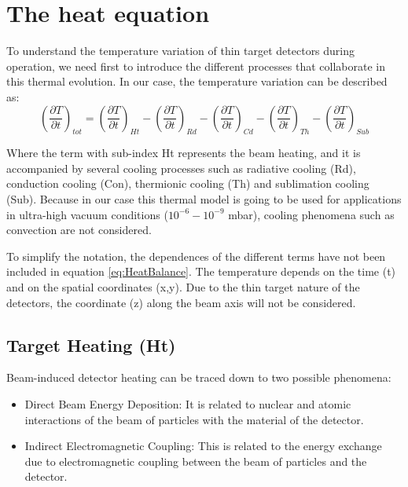 \section{The heat equation}
\label{sec:HeatEq}

To understand the temperature variation of thin target detectors during operation, we need first to introduce the different processes that collaborate in this thermal evolution. In our case, the temperature variation can be described as: 
\begin{equation}
    \left(\frac{\partial T}{\partial t}\right)_{tot} = \left(\frac{\partial T}{\partial t}\right)_{Ht} - \left(\frac{\partial T}{\partial t}\right)_{Rd} - 
                 \left(\frac{\partial T}{\partial t}\right)_{Cd} - \left(\frac{\partial T}{\partial t}\right)_{Th} - \left(\frac{\partial T}{\partial t}\right)_{Sub}
    \label{eq:HeatBalance}
\end{equation}

Where the term with sub-index Ht represents the beam heating, and it is accompanied by several cooling processes such as radiative cooling (Rd), conduction cooling (Con), thermionic cooling (Th) and sublimation cooling (Sub). Because in our case this thermal model is going to be used for applications in ultra-high vacuum conditions ($10^{-6} - 10^{-9}$ mbar), cooling phenomena such as convection are not considered. 

To simplify the notation, the dependences of the different terms have not been included in equation \ref{eq:HeatBalance}. The temperature depends on the time (t) and on the spatial coordinates (x,y). Due to the thin target nature of the detectors, the coordinate (z) along the beam axis will not be considered. 

\subsection{Target Heating (Ht)}
\label{sec:BeamHeating}

Beam-induced detector heating can be traced down to two possible phenomena: 

\begin{itemize}
    \item Direct Beam Energy Deposition: It is related to nuclear and atomic interactions of the beam of particles with the material of the detector. 
    \item Indirect Electromagnetic Coupling: This is related to the energy exchange due to electromagnetic coupling between the beam of particles and the detector. 
\end{itemize}

